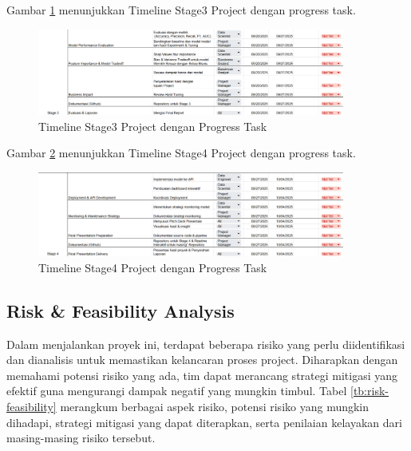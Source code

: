 Gambar \ref{fig:timeline3} menunjukkan Timeline Stage3 Project dengan progress task.

\begin{figure}[H]
    \centering
    \includegraphics[width=0.9\textwidth]{gambar/timeline3.png}
    \caption{Timeline Stage3 Project dengan Progress Task}
    \label{fig:timeline3}
\end{figure}

Gambar \ref{fig:timeline4} menunjukkan Timeline Stage4 Project dengan progress task.

\begin{figure}[H]
    \centering
    \includegraphics[width=0.9\textwidth]{gambar/timeline4.png}
    \caption{Timeline Stage4 Project dengan Progress Task}
    \label{fig:timeline4}
\end{figure}



\subsection{Risk \& Feasibility Analysis}
Dalam menjalankan proyek ini, terdapat beberapa risiko yang perlu diidentifikasi dan dianalisis untuk memastikan kelancaran proses project. Diharapkan dengan memahami potensi risiko yang ada, tim dapat merancang strategi mitigasi yang efektif guna mengurangi dampak negatif yang mungkin timbul. Tabel \ref{tb:risk-feasibility} merangkum berbagai aspek risiko, potensi risiko yang mungkin dihadapi, strategi mitigasi yang dapat diterapkan, serta penilaian kelayakan dari masing-masing risiko tersebut.



